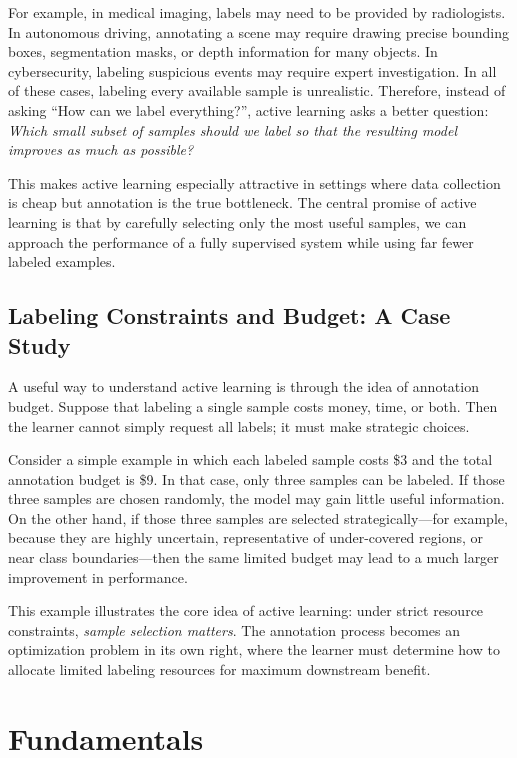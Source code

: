 \documentclass{article}
\begin{document}
For example, in medical imaging, labels may need to be provided by radiologists. In autonomous driving, annotating a scene may require drawing precise bounding boxes, segmentation masks, or depth information for many objects. In cybersecurity, labeling suspicious events may require expert investigation. In all of these cases, labeling every available sample is unrealistic. Therefore, instead of asking ``How can we label everything?'', active learning asks a better question: \emph{Which small subset of samples should we label so that the resulting model improves as much as possible?}

This makes active learning especially attractive in settings where data collection is cheap but annotation is the true bottleneck. The central promise of active learning is that by carefully selecting only the most useful samples, we can approach the performance of a fully supervised system while using far fewer labeled examples. 

\subsection{Labeling Constraints and Budget: A Case Study}
A useful way to understand active learning is through the idea of annotation budget. Suppose that labeling a single sample costs money, time, or both. Then the learner cannot simply request all labels; it must make strategic choices.

Consider a simple example in which each labeled sample costs \$3 and the total annotation budget is \$9. In that case, only three samples can be labeled. If those three samples are chosen randomly, the model may gain little useful information. On the other hand, if those three samples are selected strategically---for example, because they are highly uncertain, representative of under-covered regions, or near class boundaries---then the same limited budget may lead to a much larger improvement in performance.

This example illustrates the core idea of active learning: under strict resource constraints, \emph{sample selection matters}. The annotation process becomes an optimization problem in its own right, where the learner must determine how to allocate limited labeling resources for maximum downstream benefit. 

\section{Fundamentals}
\end{document}
